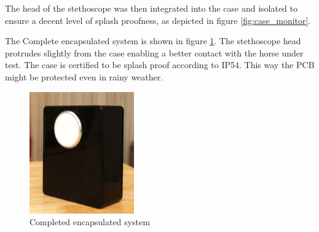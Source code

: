 The head of the stethoscope was then integrated into the case and isolated to ensure a decent level of splash proofness, as depicted in figure \ref{fig:case_monitor}.

The Complete encapsulated system is shown in figure \ref{fig:complete_monitor}. The stethoscope head protrudes slightly from the case enabling a better contact with the horse under test. The case is certified to be splash proof according to IP54. This way the PCB might be protected even in rainy weather. 

\begin{figure}[htb]
\centering
\includegraphics[width=0.4\textwidth]{Images/case_closed.jpg}
\caption{Completed encapsulated system}
\label{fig:complete_monitor}
\end{figure}